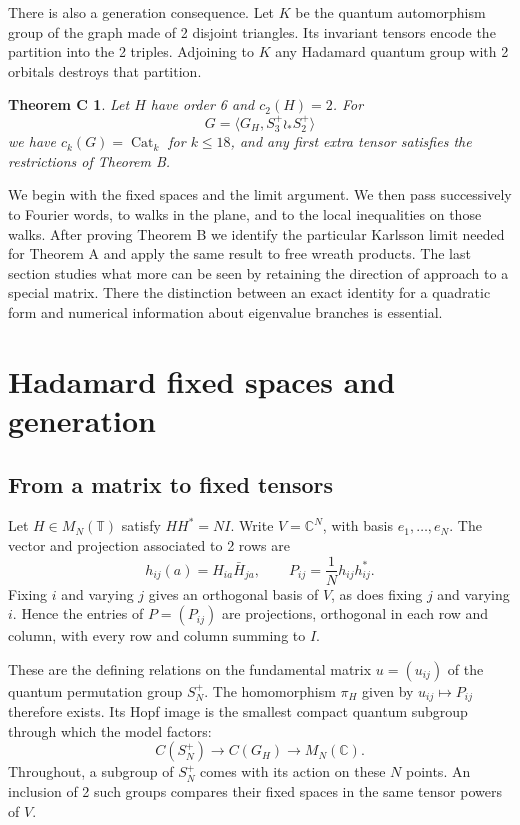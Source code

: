 \documentclass[11pt,a4paper]{amsart}
\newtheorem*{thmC}{Theorem C}
\newcommand{\T}{\mathbb T}
\newcommand{\Cat}{\operatorname{Cat}}
\begin{document}
There is also a generation consequence. Let $K$ be the quantum automorphism group of the graph made of 2 disjoint triangles. Its invariant tensors encode the partition into the 2 triples. Adjoining to $K$ any Hadamard quantum group with 2 orbitals destroys that partition.
\begin{thmC}
Let $H$ have order 6 and $c_2(H)=2$. For
\[
 G=\langle G_H,S_3^+\wr_*S_2^+\rangle
\]
we have $c_k(G)=\Cat_k$ for $k\leq18$, and any first extra tensor satisfies the restrictions of Theorem B.
\end{thmC}

We begin with the fixed spaces and the limit argument. We then pass successively to Fourier words, to walks in the plane, and to the local inequalities on those walks. After proving Theorem B we identify the particular Karlsson limit needed for Theorem A and apply the same result to free wreath products. The last section studies what more can be seen by retaining the direction of approach to a special matrix. There the distinction between an exact identity for a quadratic form and numerical information about eigenvalue branches is essential.

\section{Hadamard fixed spaces and generation}\label{sec:witness}

\subsection{From a matrix to fixed tensors}
Let $H\in M_N(\T)$ satisfy $HH^*=N I$. Write $V=\mathbb C^N$, with basis $e_1,\ldots,e_N$. The vector and projection associated to 2 rows are
\[
 h_{ij}(a)=H_{ia}\bar H_{ja},\qquad P_{ij}=\frac1N h_{ij}h_{ij}^* .
\]
Fixing $i$ and varying $j$ gives an orthogonal basis of $V$, as does fixing $j$ and varying $i$. Hence the entries of $P=(P_{ij})$ are projections, orthogonal in each row and column, with every row and column summing to $I$.

These are the defining relations on the fundamental matrix $u=(u_{ij})$ of the quantum permutation group $S_N^+$. The homomorphism $\pi_H$ given by $u_{ij}\mapsto P_{ij}$ therefore exists. Its Hopf image \cite{bb1} is the smallest compact quantum subgroup through which the model factors:
\[
 C(S_N^+)\longrightarrow C(G_H)\longrightarrow M_N(\mathbb C).
\]
Throughout, a subgroup of $S_N^+$ comes with its action on these $N$ points. An inclusion of 2 such groups compares their fixed spaces in the same tensor powers of $V$.
\end{document}
